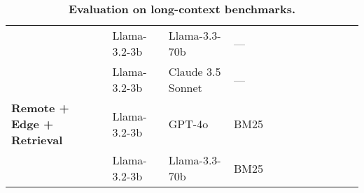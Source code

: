 \begin{table}[ht]
\begin{tabular}{llllllllllll}
                                                & Llama-3.2-3b  & Llama-3.3-70b     & ---       &           &                      &                  &             &                &           &                &           \\
                                                & Llama-3.2-3b  & Claude 3.5 Sonnet & ---       &           &                      &                  &             &                &           &                &           \\
\textbf{Remote + Edge + Retrieval} & Llama-3.2-3b  & GPT-4o            & BM25      &           &                      &                  &             &                &           &                &           \\
                                                & Llama-3.2-3b  & Llama-3.3-70b     & BM25      &           &                      &                  &             &                &           &                &           \\ \hline
\end{tabular}
\caption{\textbf{Evaluation on long-context benchmarks.}}
\end{table}